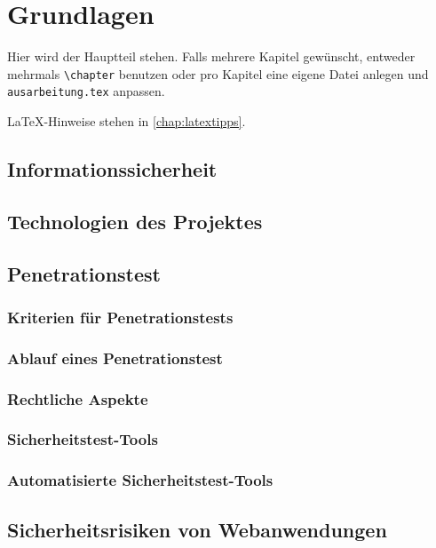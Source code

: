 \chapter{Grundlagen}
\label{chap:k2}

Hier wird der Hauptteil stehen. Falls mehrere Kapitel gewünscht, entweder mehrmals \texttt{\textbackslash{}chapter} benutzen oder pro Kapitel eine eigene Datei anlegen und \texttt{ausarbeitung.tex} anpassen.

LaTeX-Hinweise stehen in \cref{chap:latextipps}.

\section{Informationssicherheit}

\section{Technologien des Projektes}

\section{Penetrationstest}

\subsection{Kriterien für Penetrationstests}

\subsection{Ablauf eines Penetrationstest}

\subsection{Rechtliche Aspekte}

\subsection{Sicherheitstest-Tools}

\subsection{Automatisierte Sicherheitstest-Tools}

\section{Sicherheitsrisiken von Webanwendungen}

